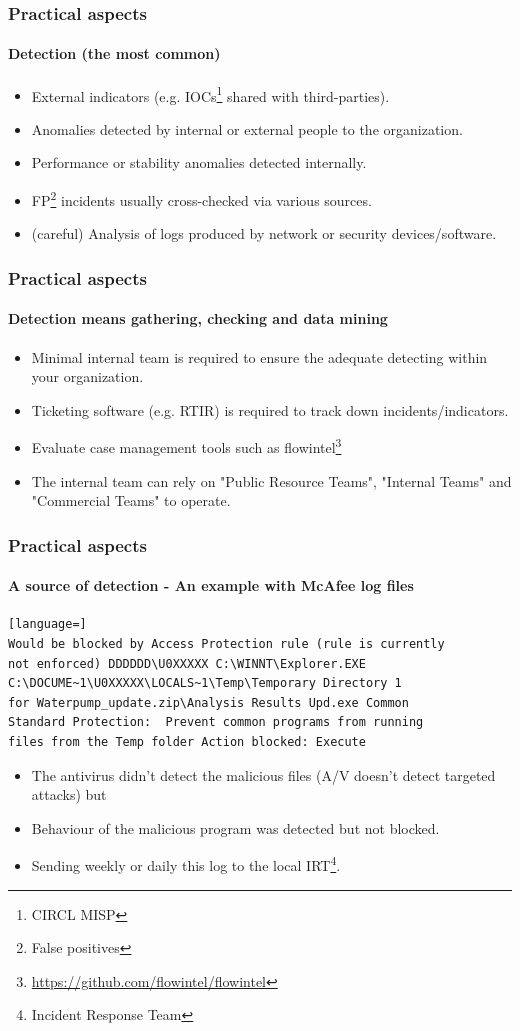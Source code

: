 \begin{frame}
\frametitle{Practical aspects}
\framesubtitle{Detection (the most common)}
\begin{itemize}
        \item External indicators (e.g. IOCs\footnote{CIRCL MISP} shared with third-parties).
\item Anomalies detected by internal or external people to the organization.
\item Performance or stability anomalies detected internally.
\item FP\footnote{False positives} incidents usually cross-checked via various sources.
\item (careful) Analysis of logs produced by network or security devices/software.
\end{itemize}
\end{frame}

\begin{frame}
\frametitle{Practical aspects}
\framesubtitle{Detection means gathering, checking and data mining}
\begin{itemize}
\item Minimal internal team is required to ensure the adequate detecting within your organization.
\item Ticketing software (e.g. RTIR) is required to track down incidents/indicators.
\item Evaluate case management tools such as flowintel\footnote{\url{https://github.com/flowintel/flowintel}}
\item The internal team can rely on "Public Resource Teams", "Internal Teams" and "Commercial Teams" to operate.
\end{itemize}
\end{frame}

\begin{frame}[fragile]
\frametitle{Practical aspects}
\framesubtitle{A source of detection - An example with McAfee log files}
\begin{lstlisting}[language=]
Would be blocked by Access Protection rule (rule is currently
not enforced) DDDDDD\U0XXXXX C:\WINNT\Explorer.EXE
C:\DOCUME~1\U0XXXXX\LOCALS~1\Temp\Temporary Directory 1
for Waterpump_update.zip\Analysis Results Upd.exe Common
Standard Protection:  Prevent common programs from running
files from the Temp folder Action blocked: Execute
\end{lstlisting}
\begin{itemize}
\item The antivirus didn't detect the malicious files (A/V doesn't detect targeted attacks) but
\item Behaviour of the malicious program was detected but not blocked.
\item Sending weekly or daily this log to the local IRT\footnote{Incident Response Team}.
\end{itemize}
\end{frame}

